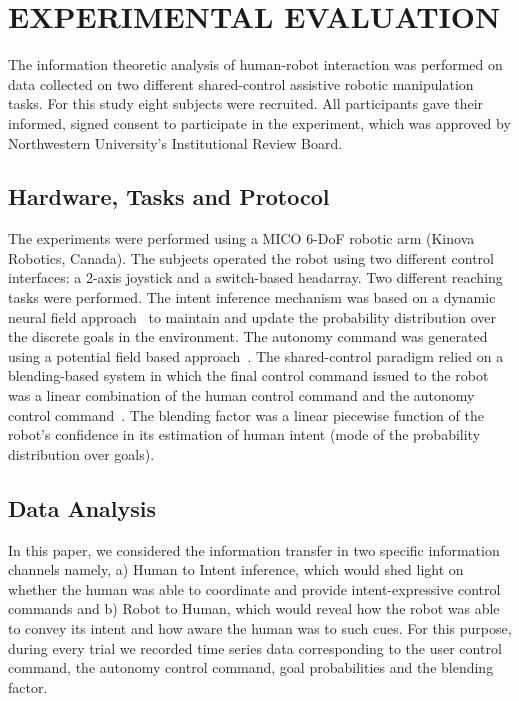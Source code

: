 \documentclass[letterpaper, 10 pt, conference]{ieeeconf}  %
\begin{document}
\section{EXPERIMENTAL EVALUATION}\label{sec:exp_setup}
The information theoretic analysis of human-robot interaction was performed on data collected on two different shared-control assistive robotic manipulation tasks. For this study eight subjects were recruited. All participants gave their informed, signed consent to participate in the experiment, which was approved by Northwestern University's Institutional Review Board. 
\subsection{Hardware, Tasks and Protocol}
The experiments were performed using a MICO 6-DoF robotic arm (Kinova Robotics, Canada). The subjects operated the robot using two different control interfaces: a 2-axis joystick and a switch-based headarray. Two different reaching tasks were performed. The intent inference mechanism was based on a dynamic neural field approach~\cite{gopinath2018dynamic} to maintain and update the probability distribution over the discrete goals in the environment. The autonomy command was generated using a potential field based approach~\cite{khatib1986real}. The shared-control paradigm relied on a blending-based system in which the final control command issued to the robot was a linear combination of the human control command and the autonomy control command~\cite{dragan2013policy}. The blending factor was a linear piecewise function of the robot's confidence in its estimation of human intent (mode of the probability distribution over goals). 

\subsection{Data Analysis}

In this paper, we considered the information transfer in two specific information channels namely, a) Human to Intent inference, which would shed light on whether the human was able to coordinate and provide intent-expressive control commands and b) Robot to Human, which would reveal how the robot was able to convey its intent and how aware the human was to such cues. For this purpose, during every trial we recorded time series data corresponding to the user control command, the autonomy control command, goal probabilities and the blending factor. 
\end{document}
